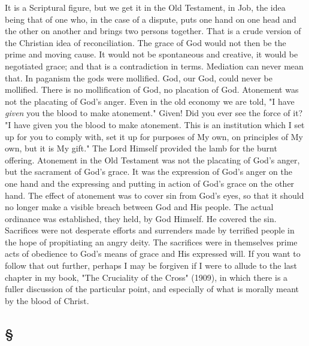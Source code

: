 \documentclass[draft]{ptfdoc}
\begin{document}
It is a Scriptural figure, but we get it in the 
Old Testament, in Job, the idea being that of 
one who, in the case of a dispute, puts one hand 
on one head and the other on another and 
brings two persons together. That is a crude 
version of the Christian idea of reconciliation. 
The grace of God would not then be the prime 
and moving cause. It would not be spontaneous 
and creative, it would be negotiated grace; and 
that is a contradiction in terms. Mediation can 
never mean that. In paganism the gods were 
mollified. God, our God, could never be mollified. 
There is no mollification of God, no placation of 
God. Atonement was not the placating of God's 
anger. Even in the old economy we are told, "I 
have \textit{given} you the blood to make atonement." 
Given! Did you ever see the force of it? "I 
have given you the blood to make atonement. 
This is an institution which I set up for you to 
comply with, set it up for purposes of My own, 
on principles of My own, but it is My gift." The 
Lord Himself provided the lamb for the burnt 
offering. Atonement in the Old Testament was 
not the placating of God's anger, but the sacrament 
of God's grace. It was the expression 
of God's anger on the one hand and the expressing 
and putting in action of God's grace on the 
other hand. The effect of atonement was to 
cover sin from God's eyes, so that it should no 
longer make a visible breach between God and 
His people. The actual ordinance was established, 
they held, by God Himself. He covered 
the sin. Sacrifices were not desperate efforts and 
surrenders made by terrified people in the hope 
of propitiating an angry deity. The sacrifices 
were in themselves prime acts of obedience 
to God's means of grace and His expressed will. 
If you want to follow that out further, perhaps 
I may be forgiven if I were to allude to the 
last chapter in my book, "The Cruciality of 
the Cross" (1909), in which there is a fuller 
discussion of the particular point, and especially 
of what is morally meant by the blood of 
Christ. 

\subsection*{
\S
}
\end{document}
